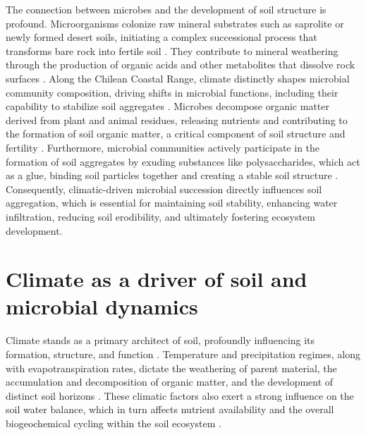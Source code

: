 The connection between microbes and the development of soil structure is profound. Microorganisms colonize raw mineral substrates such as saprolite or newly formed desert soils, initiating a complex successional process that transforms bare rock into fertile soil \citep{Lázaro2008,Stradling2002}. They contribute to mineral weathering through the production of organic acids and other metabolites that dissolve rock surfaces \citep{Bajerski2013,Mavris2010,Styriakova2012}. Along the Chilean Coastal Range, climate distinctly shapes microbial community composition, driving shifts in microbial functions, including their capability to stabilize soil aggregates \citep{Bernhard2018}. Microbes decompose organic matter derived from plant and animal residues, releasing nutrients and contributing to the formation of soil organic matter, a critical component of soil structure and fertility \cite{Oades1993}. Furthermore, microbial communities actively participate in the formation of soil aggregates by exuding substances like polysaccharides, which act as a glue, binding soil particles together and creating a stable soil structure \citep{Martens1992,SchlechtPietsch1994}. Consequently, climatic-driven microbial succession directly influences soil aggregation, which is essential for maintaining soil stability, enhancing water infiltration, reducing soil erodibility, and ultimately fostering ecosystem development.

\section{Climate as a driver of soil and microbial dynamics}
\label{sec:ClimateMicrobialDynamics}

Climate stands as a primary architect of soil, profoundly influencing its formation, structure, and function \citep{Jenny1941}. Temperature and precipitation regimes, along with evapotranspiration rates, dictate the weathering of parent material, the accumulation and decomposition of organic matter, and the development of distinct soil horizons \citep{Scholten2017}. These climatic factors also exert a strong influence on the soil water balance, which in turn affects nutrient availability and the overall biogeochemical cycling within the soil ecosystem \cite{Eldridge2020,Thielen2021}.

